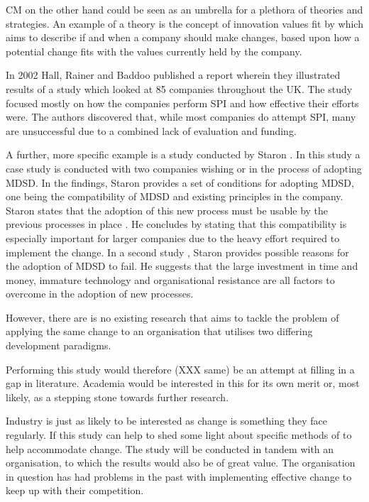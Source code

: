 \documentclass[times, 10pt,twocolumn]{Article}
\begin{document}
CM on the other hand could be seen as an umbrella for a plethora of theories and strategies. An example of a theory is the concept of innovation values fit by \cite{klein1996challenge} which aims to describe if and when a company should make changes, based upon how a potential change fits with the values currently held by the company.

In 2002 Hall, Rainer and Baddoo \cite{hall2002implementing} published a report wherein they illustrated results of a study which looked at 85 companies throughout the UK. The study focused mostly on how the companies perform SPI and how effective their efforts were. The authors discovered that, while most companies do attempt SPI, many are unsuccessful due to a combined lack of evaluation and funding.

A further, more specific example is a study conducted by Staron \cite{staron2006adopting}. In this study a case study is conducted with two companies wishing or in the process of adopting MDSD. In the findings, Staron provides a set of conditions for adopting MDSD, one being the compatibility of MDSD and existing principles in the company. Staron states that the adoption of this new process must be usable by the previous processes in place \cite{staron2006adopting}. He concludes by stating that this compatibility is especially important for larger companies due to the heavy effort required to implement the change. In a second study \cite{staron2008transitioning}, Staron provides possible reasons for the adoption of MDSD to fail. He suggests that the large investment in time and money, immature technology and organisational resistance are all factors to overcome in the adoption of new processes.

However, there are is no existing research that aims to tackle the problem of applying the same change to an organisation that utilises two differing development paradigms.

Performing this study would therefore (XXX same) be an attempt at filling in a gap in literature. Academia would be interested in this for its own merit or, most likely, as a stepping stone towards further research.

Industry is just as likely to be interested as change is something they face regularly. If this study can help to shed some light about specific methods of to help accommodate change. The study will be conducted in tandem with an organisation, to which the results would also be of great value. The organisation in question has had problems in the past with implementing effective change to keep up with their competition. 
\end{document}
